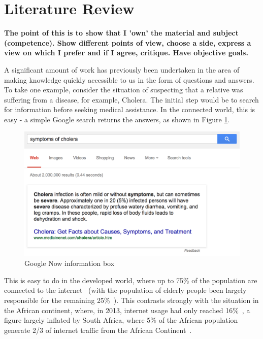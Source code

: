 \documentclass{article}
\begin{document}
\newpage

\section{Literature Review}
\label{sec:literatureReview}

{\bf The point of this is to show that I 'own' the material and subject (competence).  Show different points of view, choose a side, express a view on which I prefer and if I agree, critique.  Have objective goals.}

A significant amount of work has previously been undertaken in the area of making knowledge quickly accessible to us in the form of questions and answers.  To take one example, consider the situation of suspecting that a relative was suffering from a disease, for example, Cholera.  The initial step would be to search for information before seeking medical assistance.  In the connected world, this is easy - a simple Google search returns the answers, as shown in Figure \ref{fig:cholera}.

\begin{figure}[htb] 
\includegraphics[width=\linewidth]{googleCholera}
\caption{Google Now information box}
\label{fig:cholera}
\end{figure}


This is easy to do in the developed world, where up to 75\% of the population are connected to the internet~\cite{ITU_Cell_Usage_2013} (with the population of elderly people been largely responsible for the remaining 25\%~\cite{Gov_Internet_Usage_UK_2014}).  This contrasts strongly with the situation in the African continent, where, in 2013, internet usage had only reached 16\%~\cite{ITU_Cell_Usage_2013}, a figure largely inflated by South Africa, where 5\% of the African population generate 2/3 of internet traffic from the African Continent~\cite{ITU_Cell_Usage_2013}.
\end{document}
